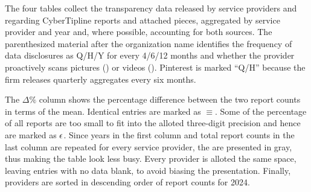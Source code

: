 \begin{table}
\begin{tabular}{r@{\hskip 1.5em}rrr r@{\hskip 1.5em}rrr}
\bottomrule
\end{tabular}
\end{table}


The four tables collect the transparency data released by service providers and
 regarding CyberTipline reports and attached pieces, aggregated by
service provider and year and, where possible, accounting for both sources. The
parenthesized material after the organization name identifies the frequency of
data disclosures as Q/H/Y for every 4/6/12 months and whether the provider
proactively scans pictures (\ImageCheck) or videos (\VideoCheck). Pinterest is
marked ``Q/H'' because the firm releases quarterly aggregates every six months.

The $\Delta\%$ column shows the percentage difference between the two report
counts in terms of the mean. Identical entries are marked as $\equiv$. Some of
the percentage of all reports are too small to fit into the alloted three-digit
precision and hence are marked as $\epsilon$. Since years in the first column and
total report counts in the last column are repeated for every service provider,
the are presented in gray, thus making the table look less busy. Every provider
is alloted the same space, leaving entries with no data blank, to avoid biasing
the presentation. Finally, providers are sorted in descending order of report
counts for 2024.
